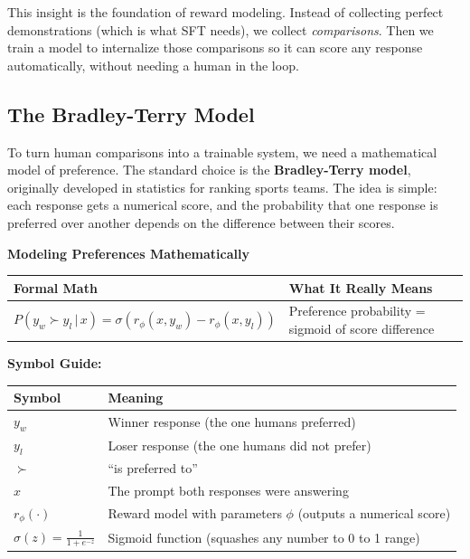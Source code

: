\begin{chapterenv}
This insight is the foundation of reward modeling. Instead of collecting perfect demonstrations (which is what SFT needs), we collect \textit{comparisons}. Then we train a model to internalize those comparisons so it can score any response automatically, without needing a human in the loop.

\subsection{The Bradley-Terry Model}

To turn human comparisons into a trainable system, we need a mathematical model of preference. The standard choice is the \textbf{Bradley-Terry model}, originally developed in statistics for ranking sports teams. The idea is simple: each response gets a numerical score, and the probability that one response is preferred over another depends on the difference between their scores.

\begin{infobox}
\textbf{Modeling Preferences Mathematically}

\begin{center}
\begin{tabular}{p{}p{}}
\toprule
\textbf{Formal Math} & \textbf{What It Really Means} \\
\midrule
$P(y_w \succ y_l \,|\, x) = \sigma(r_\phi(x, y_w) - r_\phi(x, y_l))$ & Preference probability = sigmoid of score difference \\
\bottomrule
\end{tabular}
\end{center}

\textbf{Symbol Guide:}

\begin{center}
\begin{tabular}{p{}p{}}
\toprule
\textbf{Symbol} & \textbf{Meaning} \\
\midrule
$y_w$ & Winner response (the one humans preferred) \\
$y_l$ & Loser response (the one humans did not prefer) \\
$\succ$ & ``is preferred to'' \\
$x$ & The prompt both responses were answering \\
$r_\phi(\cdot)$ & Reward model with parameters $\phi$ (outputs a numerical score) \\
$\sigma(z) = \frac{1}{1+e^{-z}}$ & Sigmoid function (squashes any number to 0 to 1 range) \\
\bottomrule
\end{tabular}
\end{center}


\end{infobox}
\end{chapterenv}
